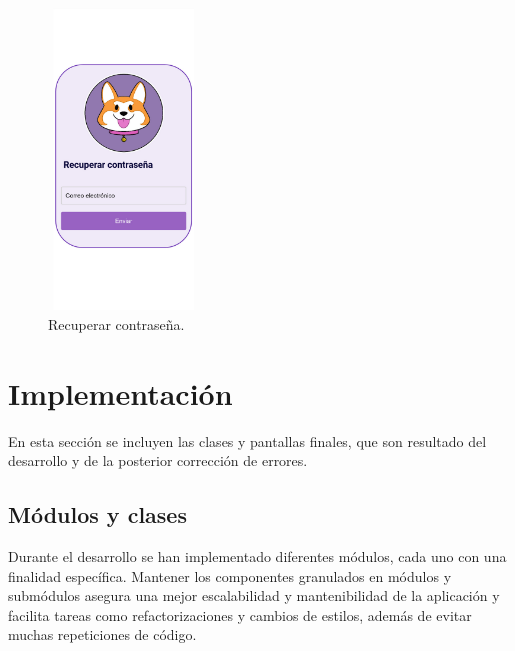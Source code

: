 \documentclass[a4paper, 12pt]{article}
\begin{document}
\begin{figure}[H]
   	\begin{minipage}{0.48\textwidth}
		\begin{center}
			{\includegraphics[height=8cm, width=4cm]{design/PasswordRecovery.jpg}\par}
			\caption{Recuperar contraseña.}
			\medskip
		\end{center}  
	\end{minipage}\hfill
\end{figure}


\newpage
\section{Implementación}

En esta sección se incluyen las clases y pantallas finales, que son resultado del desarrollo y de la posterior corrección de errores.

\subsection{Módulos y clases}
Durante el desarrollo se han implementado diferentes módulos, cada uno con una finalidad específica. Mantener los componentes granulados en módulos y submódulos asegura una mejor escalabilidad y mantenibilidad de la aplicación y facilita tareas como refactorizaciones y cambios de estilos, además de evitar muchas repeticiones de código.
\end{document}
